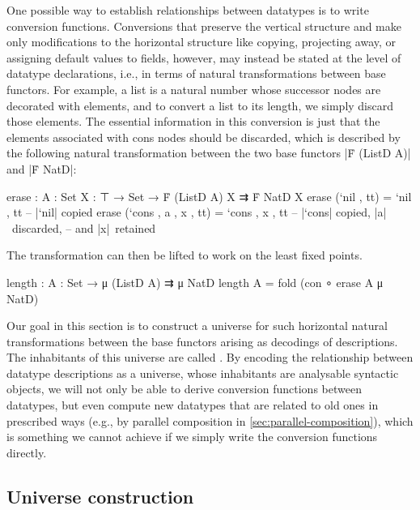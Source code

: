 One possible way to establish relationships between datatypes is to write conversion functions.
Conversions that preserve the vertical structure and make only modifications to the horizontal structure like copying, projecting away, or assigning default values to fields, however, may instead be stated at the level of datatype declarations, i.e., in terms of natural transformations between base functors.
For example, a list is a natural number whose successor nodes are decorated with elements, and to convert a list to its length, we simply discard those elements.
The essential information in this conversion is just that the elements associated with cons nodes should be discarded, which is described by the following natural transformation between the two base functors |Ḟ (ListD A)| and |Ḟ NatD|:
\begin{code}
erase : {A : Set} {X : ⊤ → Set} → Ḟ (ListD A) X ⇉ Ḟ NatD X
erase (`nil   ,          tt)  =  `nil   ,       tt  -- |`nil| copied
erase (`cons  , a , x ,  tt)  =  `cons  ,  x ,  tt   -- |`cons| copied, |a|~discarded,
                                                     -- and |x|~retained
\end{code}
The transformation can then be lifted to work on the least fixed points.
\begin{code}
length : {A : Set} → μ (ListD A) ⇉ μ NatD
length {A} = fold (con ∘ erase {A} {μ NatD})
\end{code}
Our goal in this section is to construct a universe for such horizontal natural transformations between the base functors arising as decodings of descriptions.
The inhabitants of this universe are called .
By encoding the relationship between datatype descriptions as a universe, whose inhabitants are analysable syntactic objects, we will not only be able to derive conversion functions between datatypes, but even compute new datatypes that are related to old ones in prescribed ways (e.g., by parallel composition in \autoref{sec:parallel-composition}), which is something we cannot achieve if we simply write the conversion functions directly.

\subsection{Universe construction}

